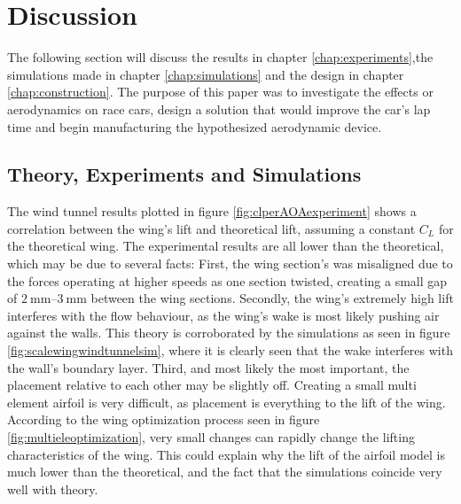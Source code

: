 \chapter{Discussion}
  The following section will discuss the results in chapter \ref{chap:experiments},the simulations made in chapter \ref{chap:simulations} and the design in chapter \ref{chap:construction}. The purpose of this paper was to investigate the effects or aerodynamics on race cars, design a solution that would improve the car's lap time and begin manufacturing the hypothesized aerodynamic device.

  \section{Theory, Experiments and Simulations}

  The wind tunnel results plotted in figure \ref{fig:clperAOAexperiment} shows a correlation between the wing's lift and theoretical lift, assuming a constant $C_L$ for the theoretical wing. The experimental results are all lower than the theoretical, which may be due to several facts: First, the wing section's was misaligned due to the forces operating at higher speeds as one section twisted,  creating a small gap of $\SIrange{2}{3}{\milli\metre}$ between the wing sections. Secondly, the wing's extremely high lift interferes with the flow behaviour, as the wing's wake is most likely pushing air against the walls. This theory is corroborated by the simulations as seen in figure \ref{fig:scalewingwindtunnelsim}, where it is clearly seen that the wake interferes with the wall's boundary layer. Third, and most likely the most important, the placement relative to each other may be slightly off. Creating a small multi element airfoil is very difficult, as placement is everything to the lift of the wing. According to the wing optimization process seen in figure \ref{fig:multieleoptimization}, very small changes can rapidly change the  lifting characteristics of the wing. This could explain why the lift of the airfoil model is much lower than the theoretical, and the fact that the simulations coincide very well with theory.


